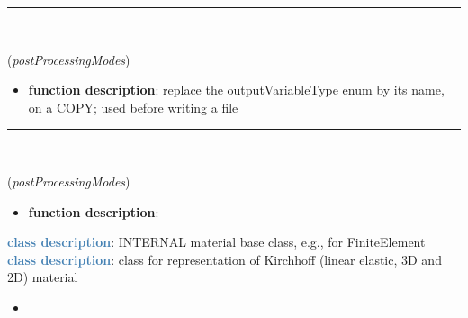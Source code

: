 \begin{itemize}[leftmargin=1.4cm]
\begin{itemize}[leftmargin=1.4cm]
\begin{itemize}[leftmargin=1.4cm]
\begin{itemize}[leftmargin=0.5cm]
\begin{itemize}[leftmargin=1.4cm]
\begin{itemize}[leftmargin=1.4cm]
\begin{itemize}[leftmargin=1.4cm]
\begin{itemize}[leftmargin=0.5cm]
%
\noindent\rule{8cm}{0.75pt}\vspace{1pt} \\ 
\begin{flushleft}
\label{sec:FEM:PostProcessingModesToStorage}
({\it postProcessingModes})
\end{flushleft}
\setlength{\itemindent}{0.7cm}
\begin{itemize}[leftmargin=0.7cm]
\item[--]
{\bf function description}: replace the outputVariableType enum by its name, on a COPY; used before writing a file
\vspace{12pt}\end{itemize}
%
\noindent\rule{8cm}{0.75pt}\vspace{1pt} \\ 
\begin{flushleft}
\label{sec:FEM:PostProcessingModesFromStorage}
({\it postProcessingModes})
\end{flushleft}
\setlength{\itemindent}{0.7cm}
\begin{itemize}[leftmargin=0.7cm]
\item[--]
{\bf function description}: \vspace{-6pt}
\vspace{12pt}\end{itemize}
%
\noindent\textcolor{steelblue}{{\bf class description}}:  INTERNAL material base class, e.g., for FiniteElement
\vspace{3pt} \\ 
\noindent\textcolor{steelblue}{{\bf class description}}:  class for representation of Kirchhoff (linear elastic, 3D and 2D) material
\setlength{\itemindent}{0.7cm}
\begin{itemize}[leftmargin=0.7cm]
\item[--]

\end{itemize}
\end{itemize}
\end{itemize}
\end{itemize}
\end{itemize}
\end{itemize}
\end{itemize}
\end{itemize}
\end{itemize}
